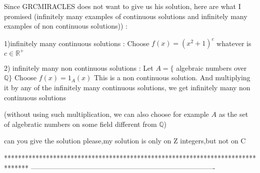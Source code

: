 \begin{solution}
	Since GRCMIRACLES does not want to give us his solution, here are what I promised (infinitely many examples of continuous solutions and infinitely many examples of non continuous solutions)) :

1)infinitely many continuous solutions :
Choose $f(x)=(x^2+1)^c$ whatever is $c\in\mathbb R^+$

2) infinitely many non continuous solutions :
Let $A=\{$ algebraic numbers over $\mathbb Q\}$
Choose $f(x)=1_A(x)$
This is a non continuous solution.
And multiplying it by any of the infinitely many continuous solutions, we get infinitely many non continuous solutions

(without using such multiplication, we can also choose for example $A$ as the set of algebratic numbers on some field different from $\mathbb Q$)

\end{solution}



\begin{solution}
	can you give the solution please,my solution is only on Z {integers},but not on C
\end{solution}



*******************************************************************************
-------------------------------------------------------------------------------

